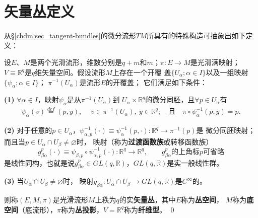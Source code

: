     


\section{矢量丛定义}\label{chfb:sec_vector-bundles}

从\S \ref{chdm:sec_tangent-bundles}的微分流形$TM$所具有的特殊构造可抽象出如下定义：
\begin{definition}\label{chfb:def_vector-bundles}
    设$E$、$M$是两个光滑流形，维数分别是$q+m$和$m$；$\pi:E\to M$是光滑满映射；
    $V\equiv \mathbb{R}^q$是$q$维矢量空间。假设流形$M$上存在一个开覆
    盖$\{U_\alpha; \alpha\in I\}$以及一组映射$\{\psi_\alpha; \alpha\in I\}$；
    $\pi^{-1}(U_\alpha)$是流形$E$的开覆盖；
    它们满足如下条件：
    
    {\bfseries (1)} $\forall \alpha \in I$，映射$\psi_\alpha$是从$\pi^{-1}(U_\alpha)$到
    $U_\alpha \times \mathbb{R}^q$的微分同胚，且$\forall p \in U_\alpha$有
    \begin{align*}
        \psi_\alpha\left(v\right) \overset{def}{=} \left(p, y \right),
        \quad \ v\in \pi^{-1} (U_\alpha),\ y \in \mathbb{R}^q ; 
        \quad \text{且}\quad
        \pi \circ \psi_\alpha^{-1} (p,y) = p.
    \end{align*}
    
    {\bfseries (2)} 对于任意的$p\in U_\alpha$，$\psi^{-1}_{\alpha,p}(\cdot)\equiv 
    \psi^{-1}_\alpha(p,\cdot):\mathbb{R}^q\to \pi^{-1}(p)$是
    微分同胚映射；而且当$p\in U_\alpha \cap U_\beta \neq \varnothing$时，
    映射（称为\textbf{过渡函数族}或转移函数族）
    \begin{equation*}
        g^p_{\beta\alpha} (\cdot)
        \equiv \psi_{\beta,p} \circ \psi^{-1}_{\alpha,p}(\cdot ) : \mathbb{R}^q\to\mathbb{R}^q ,
        \qquad g^p_{\beta\alpha}\text{的上角标$p$可省略}
    \end{equation*}
    是线性同构，也就是说$g^p_{\beta\alpha}\in GL(q,\mathbb{R})$，$GL(q,\mathbb{R})$是{\kaishu 实}一般线性群。
    
    {\bfseries (3)} 当$U_\alpha \cap U_\beta \neq \varnothing$时，
    映射$g_{\beta\alpha}: U_\alpha \cap U_\beta \to GL(q,\mathbb{R})$是$C^\infty$的。
    
    则称$(E,M,\pi)$是光滑流形$M$上秩为$q$的实\textbf{矢量丛}，其中$E$称为\textbf{丛空间}，
    $M$称为\textbf{底空间}（底流形），$\pi$称为\textbf{丛投影}，$V=\mathbb{R}^q$称为\textbf{纤维型}。
\qed
\end{definition}

